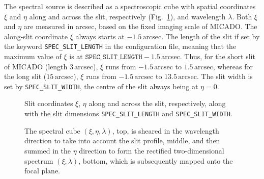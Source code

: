 \documentclass[a4paper,twoside,11pt]{article}
\begin{document}
The spectral source is described as a spectroscopic cube with spatial
coordinates $\xi$ and $\eta$ along and across the slit, respectively
(Fig.~\ref{fig:slit_coords}), and wavelength $\lambda$. Both $\xi$ and
$\eta$ are measured in arcsec, based on the fixed imaging scale of
MICADO. The along-slit coordinate $\xi$ always starts at
$-1.5\,\mathrm{arcsec}$. The length of the slit if set by the keyword
\lstinline{SPEC_SLIT_LENGTH} in the configuration file, meaning that
the maximum value of $\xi$ is at
$\mathtt{SPEC\_SLIT\_LENGTH} - 1.5$\,arcsec. Thus, for the short slit
of MICADO (length $3\,\mathrm{arcsec}$), $\xi$ runs from
$-1.5\,\mathrm{arcsec}$ to $1.5\,\mathrm{arcsec}$, whereas for the
long slit ($15\,\mathrm{arcsec}$), $\xi$ runs from
$-1.5\,\mathrm{arcsec}$ to $13.5\,\mathrm{arcsec}$. The slit width is
set by \lstinline{SPEC_SLIT_WIDTH}, the centre of the slit always
being at $\eta=0$.

\begin{figure}[b]
  \centering
  \caption{Slit coordinates $\xi$, $\eta$ along and across the slit,
    respectively, along with the slit dimensions
    \lstinline{SPEC_SLIT_LENGTH} and \lstinline{SPEC_SLIT_WIDTH}.}
  \label{fig:slit_coords}
\end{figure}

\begin{figure}[b]
  \centering
  \caption{The spectral cube $(\xi, \eta, \lambda)$, top, is sheared
    in the wavelength direction to take into account the slit profile,
    middle, and then summed in the $\eta$ direction to form the
    rectified two-dimensional spectrum $(\xi, \lambda)$, bottom, which
    is subsequently mapped onto the focal plane.}
  \label{fig:cube_collapse}
\end{figure}
\end{document}
